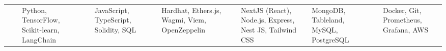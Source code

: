 \begin{tabular}{p{11em} p{1em} p{43em}} & & Python, TensorFlow, Scikit-learn, LangChain \  & & JavaScript, TypeScript, Solidity, SQL \  & & Hardhat, Ethers.js, Wagmi, Viem, OpenZeppelin \  & & NextJS (React), Node.js, Express, Nest JS, Tailwind CSS \  & & MongoDB, Tableland, MySQL, PostgreSQL \  & & Docker, Git, Prometheus, Grafana, AWS \\ \end{tabular}